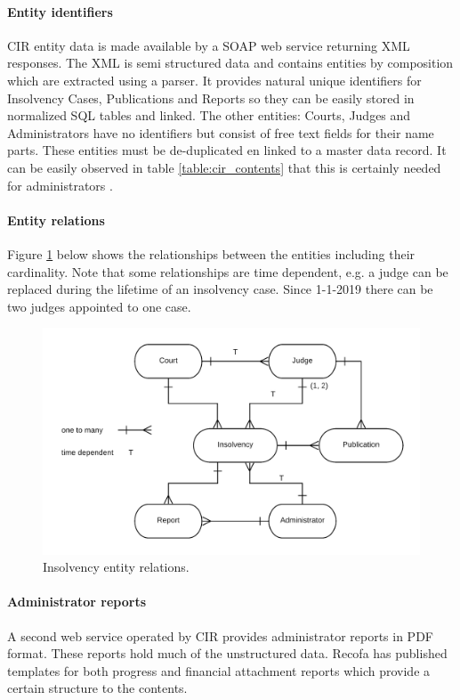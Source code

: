 \paragraph{Entity identifiers}
CIR entity data is made available by a SOAP web service returning XML responses. The XML is semi structured data and contains entities by composition which are extracted using a parser. It provides natural unique identifiers for Insolvency Cases, Publications and Reports	so they can be easily stored in normalized SQL tables and linked. The other entities: Courts, Judges and Administrators have no identifiers but consist of free text fields for their name parts. These entities must be de-duplicated en linked to a master data record. It can be easily observed in table \ref{table:cir_contents} that this is certainly needed for administrators .

\paragraph{Entity relations}
Figure \ref{fig:cir-erd} below shows the relationships between the entities including their cardinality. Note that some relationships are time dependent, e.g. a judge can be replaced during the lifetime of an insolvency case. Since 1-1-2019 there can be two judges appointed to one case.

\begin{figure}[h]
	\includegraphics[width=1\linewidth]{images/cir_erd_2.png}
	\caption{Insolvency entity relations.}
	\label{fig:cir-erd}
\end{figure}

\paragraph{Administrator reports}
A second web service operated by CIR provides administrator reports in PDF format. These reports hold much of the unstructured data. Recofa has published templates for both progress and financial attachment reports \cite{rechtspraak:recofa} which provide a certain structure to the contents.


